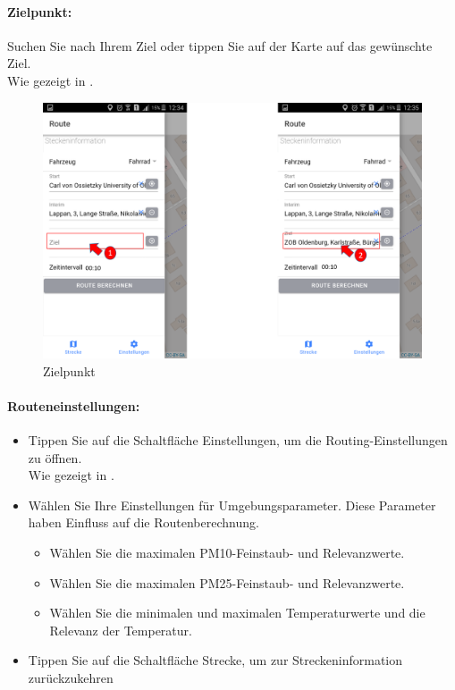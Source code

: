 \newpage

\paragraph{Zielpunkt:}
Suchen Sie nach Ihrem Ziel oder tippen Sie auf der Karte auf das gewünschte Ziel.\\
Wie gezeigt in .
\begin{figure}[h!]
\centerline{\includegraphics[height=8 cm]{./ressourcen/nutzerhandbuch/ziel.png}}
\caption{Zielpunkt}
\label{fig:app:Zielpunkt}
\end{figure}
 
\newpage
\paragraph{Routeneinstellungen:}
\begin{itemize}
  \item Tippen Sie auf die Schaltfläche Einstellungen, um die Routing-Einstellungen zu öffnen.\\
  Wie gezeigt in .
  \item Wählen Sie Ihre Einstellungen für Umgebungsparameter. Diese Parameter haben Einfluss auf die Routenberechnung.
  	\begin{itemize}
  		\item Wählen Sie die maximalen PM10-Feinstaub- und Relevanzwerte.
  		\item Wählen Sie die maximalen PM25-Feinstaub- und Relevanzwerte.
  		\item Wählen Sie die minimalen und maximalen Temperaturwerte und die Relevanz der Temperatur.
	\end{itemize}
  \item Tippen Sie auf die Schaltfläche Strecke, um zur  Streckeninformation zurückzukehren
\end{itemize}

